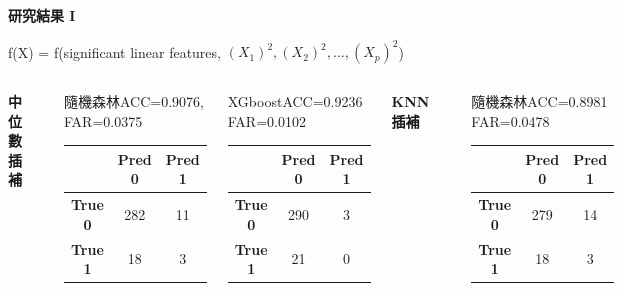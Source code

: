 \documentclass[12pt,aspectratio=43]{beamer}
\begin{document}
\begin{frame}{\textbf{研究結果 I}}
\linespread{1}

f(X) = f(significant linear features, $(X_1)^2, (X_2)^2, ..., (X_p)^2$)
\begin{columns}[T, onlytextwidth]


  \textbf{中位數插補}\\[-0.5em]\rule{\linewidth}{0.5pt}
    
  \begin{block}{隨機森林}{ACC=0.9076, FAR=0.0375}
  {\footnotesize
  \setlength{\tabcolsep}{5pt}\renewcommand{\arraystretch}{1.15}
  \begin{tabular}{c|cc}
           & \textbf{Pred 0} & \textbf{Pred 1} \\ \hline
  \textbf{True 0} & 282 & 11 \\
  \textbf{True 1} & 18  & 3  \\
  \end{tabular}}
  \end{block}

  \begin{block}{XGboost}{ACC=0.9236 FAR=0.0102}
  {\footnotesize
  \setlength{\tabcolsep}{5pt}\renewcommand{\arraystretch}{1.15}
  \begin{tabular}{c|cc}
           & \textbf{Pred 0} & \textbf{Pred 1} \\ \hline
  \textbf{True 0} & 290 & 3 \\
  \textbf{True 1} & 21  & 0  \\
  \end{tabular}}
  \end{block}


  \textbf{KNN插補}\\[-0.5em]\rule{\linewidth}{0.5pt}
  
  \begin{block}{隨機森林}{ACC=0.8981 FAR=0.0478}
  {\footnotesize
  \setlength{\tabcolsep}{5pt}\renewcommand{\arraystretch}{1.15}
  \begin{tabular}{c|cc}
        & \textbf{Pred 0} & \textbf{Pred 1} \\ \hline
  \textbf{True 0} & 279 & 14 \\
  \textbf{True 1} & 18  & 3  \\
  \end{tabular}}


\end{block}
\end{columns}
\end{frame}
\end{document}
